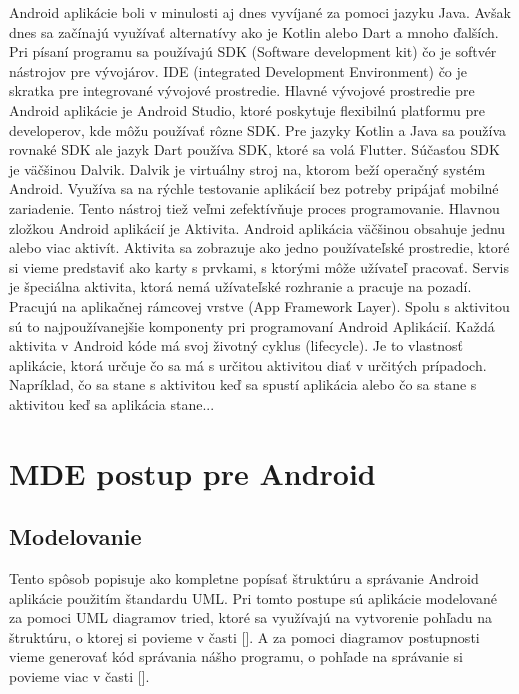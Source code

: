 \documentclass[10pt,twoside,slovak,a4paper]{article}
\begin{document}
Android aplikácie boli v minulosti aj dnes vyvíjané za pomoci jazyku Java.\cite{9032440} Avšak dnes sa začínajú využívať alternatívy ako je Kotlin alebo Dart a mnoho ďalších. Pri písaní programu sa používajú SDK (Software development kit) čo je softvér nástrojov pre vývojárov. IDE (integrated Development Environment) čo je skratka pre integrované vývojové prostredie. \newline
Hlavné vývojové prostredie pre Android aplikácie je Android Studio, ktoré poskytuje flexibilnú platformu pre developerov, kde môžu používať rôzne SDK. Pre jazyky Kotlin a Java sa používa rovnaké SDK ale jazyk Dart používa SDK, ktoré sa volá Flutter. \newline
Súčasťou SDK je väčšinou Dalvik. Dalvik je virtuálny stroj na, ktorom beží operačný systém Android. Využíva sa na rýchle testovanie aplikácií bez potreby pripájať mobilné zariadenie. Tento nástroj tiež veľmi zefektívňuje proces programovanie.\newline
Hlavnou zložkou Android aplikácií je Aktivita. Android aplikácia väčšinou obsahuje jednu alebo viac aktivít. Aktivita sa zobrazuje ako jedno používateľské prostredie, ktoré si vieme predstaviť ako karty s prvkami, s ktorými môže užívateľ pracovať.\newline
Servis je špeciálna aktivita, ktorá nemá užívateľské rozhranie a pracuje na pozadí. Pracujú na aplikačnej rámcovej vrstve (App Framework Layer). Spolu s aktivitou sú to najpoužívanejšie komponenty pri programovaní Android Aplikácií. \newline
Každá aktivita v Android kóde má svoj životný cyklus (lifecycle). Je to vlastnosť aplikácie, ktorá určuje čo sa má s určitou aktivitou diať v určitých prípadoch. Napríklad, čo sa stane s aktivitou keď sa spustí aplikácia alebo čo sa stane s aktivitou keď sa aplikácia stane... 








\section{MDE postup pre Android} \label{MDE spôsob pre Android}

\subsection{Modelovanie}\label{MDE spôsob pre Android:Modelovanie}
Tento spôsob popisuje ako kompletne popísať štruktúru a správanie Android aplikácie použitím štandardu UML. \newline
Pri tomto postupe sú aplikácie modelované za pomoci UML diagramov tried, ktoré sa využívajú na vytvorenie pohľadu na štruktúru, o ktorej si povieme v časti []. A za pomoci diagramov postupnosti vieme generovať kód správania nášho programu, o pohľade na správanie si povieme viac v časti []. 
\end{document}
